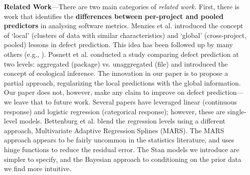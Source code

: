 \documentclass[sigconf,natbib=false]{acmart}
\begin{document}
\noindent\textbf{Related Work}---There are two main categories of \emph{related work.} 
First, there is work that identifies the \textbf{differences between per-project
and pooled predictors} in analysing software metrics. Menzies et al.
\cite{menzies11ase} introduced the concept of `local' (clusters of data with
similar characteristics) and `global' (cross-project, pooled) lessons in defect
prediction. This idea has been followed up by many others (e.g.,
\cite{Kamei2016,Bettenburg2012,panichella14}). Posnett et al.
\cite{Posnett:2011} conducted a study comparing defect prediction at two levels:
aggregated (package) vs. unaggregated (file) and introduced the concept of
ecological inference. The innovation in our paper is to propose a partial
approach, regularizing the local predictions with the global information. Our
paper does not, however, make any claim to improve on defect prediction---we
leave that to future work. Several papers \cite{Bettenburg2012,Zhou15regress}
have leveraged linear (continuous response) and logistic regression (categorical
response); however, these are single-level models. 
Bettenburg et al. \cite{Bettenburg2012} blend the regression levels using a
different approach, Multivariate Adaptive Regression Splines (MARS). The MARS
approach appears to be fairly uncommon in the statistics literature, and uses
hinge functions to reduce the residual error. The Stan models we introduce are
simpler to specify, and the Bayesian approach to conditioning on the prior data
we find more intuitive.

\end{document}
